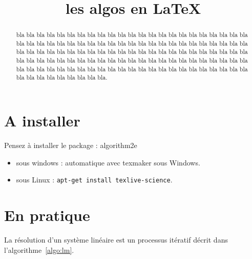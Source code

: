 \documentclass[11pt]{article}
\date{}
\begin{document}
\title{les algos en \LaTeX}
\maketitle




\begin{abstract}
bla bla bla bla bla bla bla bla bla bla bla bla bla bla bla bla bla bla bla bla bla bla bla bla bla bla bla bla bla bla bla bla bla bla bla bla bla bla bla bla bla bla bla bla bla bla bla bla bla bla bla bla bla bla bla bla bla bla bla bla bla bla bla bla bla bla bla bla bla bla bla bla bla bla bla bla bla bla bla bla bla bla bla bla bla bla bla bla bla bla bla bla bla bla bla bla bla bla bla bla bla bla bla bla bla bla bla bla bla bla bla bla bla bla bla bla bla bla bla bla bla bla bla bla.
\end{abstract}



\section{A installer}
Pensez à installer le package : algorithm2e
\begin{itemize}
\item sous windows : automatique avec texmaker sous Windows.
\item sous Linux : \texttt{apt-get install texlive-science}.
\end{itemize}

\section{En pratique}
La résolution d'un système linéaire est un processus itératif décrit dans l'algorithme~\ref{algo:lm}.
\end{document}
